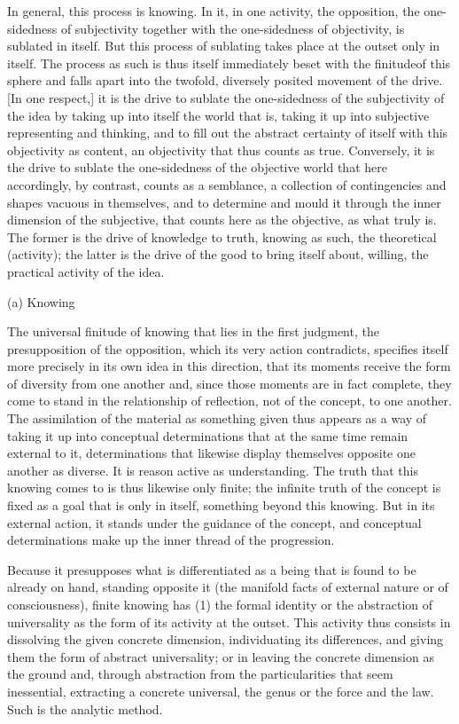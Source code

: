 In general, this process is knowing.
In it, in one activity, the opposition,
the one-sidedness of subjectivity together with
the one-sidedness of objectivity,
is sublated in itself.
But this process of sublating takes place
at the outset only in itself.
The process as such is thus itself
immediately beset with the finitudeof this sphere
and falls apart into the twofold, diversely posited
movement of the drive.
[In one respect,] it is the drive to sublate
the one-sidedness of the subjectivity of the idea
by taking up into itself the world that is,
taking it up into subjective representing and thinking,
and to fill out the abstract certainty of itself
with this objectivity as content,
an objectivity that thus counts as true.
Conversely, it is the drive to sublate
the one-sidedness of the objective world
that here accordingly, by contrast, counts as a semblance,
a collection of contingencies and shapes vacuous in themselves,
and to determine and mould it through
the inner dimension of the subjective,
that counts here as the objective, as what truly is.
The former is the drive of knowledge to truth, knowing as such,
the theoretical (activity);
the latter is the drive of the good to bring itself about, willing,
the practical activity of the idea.

(a) Knowing

The universal finitude of knowing that lies in the first judgment,
the presupposition of the opposition, which its very action contradicts,
specifies itself more precisely in its own idea in this direction,
that its moments receive the form of diversity from one another and,
since those moments are in fact complete, they come to stand in
the relationship of reflection, not of the concept, to one another.
The assimilation of the material as something given thus appears as
a way of taking it up into conceptual determinations that at the same time
remain external to it, determinations that likewise display themselves
opposite one another as diverse.
It is reason active as understanding.
The truth that this knowing comes to is thus likewise only finite;
the infinite truth of the concept is fixed as a goal that is only in itself,
something beyond this knowing.
But in its external action, it stands under the guidance of the concept,
and conceptual determinations make up the inner thread of the progression.

Because it presupposes what is differentiated
as a being that is found to be already on hand, standing opposite it
(the manifold facts of external nature or of consciousness),
finite knowing has
(1) the formal identity or
the abstraction of universality
as the form of its activity at the outset.
This activity thus consists in
dissolving the given concrete dimension,
individuating its differences,
and giving them the form of abstract universality;
or in leaving the concrete dimension as the ground and,
through abstraction from the particularities that seem inessential,
extracting a concrete universal,
the genus or the force and the law.
Such is the analytic method.

